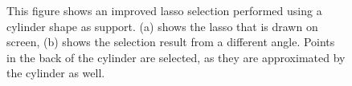 \begin{figure}
\centering
{}
\caption[Example of an improved lasso selection on a cylinder]
{This figure shows an improved lasso selection performed using a cylinder shape as support. (a) shows the lasso that is drawn on screen, (b) shows the selection result from a different angle. Points in the back of the cylinder are selected, as they are approximated by the cylinder as well. }
\label{fig:syntheticScene_lasso}
\end{figure}


